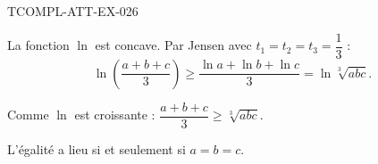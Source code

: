 \begin{corrige}{TCOMPL-ATT-EX-026}

La fonction $\ln$ est concave. Par Jensen avec $t_1=t_2=t_3=\dfrac{1}{3}$ :
\[ \ln\!\left(\frac{a+b+c}{3}\right) \geq \frac{\ln a + \ln b + \ln c}{3} = \ln\sqrt[3]{abc}. \]


Comme $\ln$ est croissante : $\dfrac{a+b+c}{3} \geq \sqrt[3]{abc}$.

L'égalité a lieu si et seulement si $a = b = c$.

\end{corrige}
